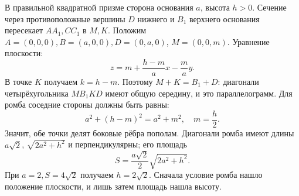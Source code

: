 \begin{example}\label{ex:review-ege-exam-solid-2}
В правильной квадратной призме сторона основания \(a\), высота \(h>0\). Сечение через противоположные вершины \(D\) нижнего и \(B_1\) верхнего основания пересекает \(AA_1,CC_1\) в \(M,K\). Положим \(A=(0,0,0),B=(a,0,0),D=(0,a,0)\), \(M=(0,0,m)\). Уравнение плоскости:
\[
z=m+\frac{h-m}{a}x-\frac ma y.
\]
В точке \(K\) получаем \(k=h-m\). Поэтому \(M+K=B_1+D\): диагонали четырёхугольника \(MB_1KD\) имеют общую середину, и это параллелограмм. Для ромба соседние стороны должны быть равны:
\[
a^2+(h-m)^2=a^2+m^2,
\quad m=\frac h2.
\]
Значит, обе точки делят боковые рёбра пополам. Диагонали ромба имеют длины \(a\sqrt2\), \(\sqrt{2a^2+h^2}\) и перпендикулярны; его площадь
\[
S=\frac{a\sqrt2}{2}\sqrt{2a^2+h^2}.
\]
При \(a=2,S=4\sqrt2\) получаем \(h=2\sqrt2\). Сначала условие ромба нашло положение плоскости, и лишь затем площадь нашла высоту.
\end{example}

